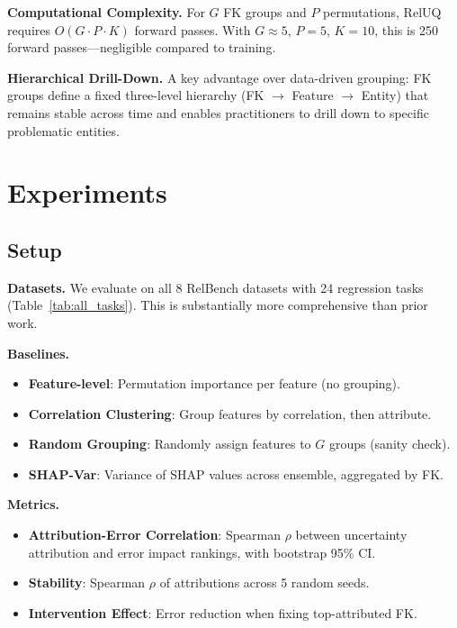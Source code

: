 \documentclass{article}
\begin{document}
\textbf{Computational Complexity.}
For $G$ FK groups and $P$ permutations, RelUQ requires $O(G \cdot P \cdot K)$ forward
passes. With $G \approx 5$, $P = 5$, $K = 10$, this is 250 forward passes---negligible
compared to training.

\textbf{Hierarchical Drill-Down.}
A key advantage over data-driven grouping: FK groups define a fixed three-level hierarchy
(FK $\to$ Feature $\to$ Entity) that remains stable across time and enables practitioners
to drill down to specific problematic entities.

\section{Experiments}
\label{sec:experiments}

\subsection{Setup}

\textbf{Datasets.} We evaluate on all 8 RelBench datasets with 24 regression tasks
(Table~\ref{tab:all_tasks}). This is substantially more comprehensive than prior work.

\textbf{Baselines.}
\begin{itemize}
    \item \textbf{Feature-level}: Permutation importance per feature (no grouping).
    \item \textbf{Correlation Clustering}: Group features by correlation, then attribute.
    \item \textbf{Random Grouping}: Randomly assign features to $G$ groups (sanity check).
    \item \textbf{SHAP-Var}: Variance of SHAP values across ensemble, aggregated by FK.
\end{itemize}

\textbf{Metrics.}
\begin{itemize}
    \item \textbf{Attribution-Error Correlation}: Spearman $\rho$ between uncertainty
    attribution and error impact rankings, with bootstrap 95\% CI.
    \item \textbf{Stability}: Spearman $\rho$ of attributions across 5 random seeds.
    \item \textbf{Intervention Effect}: Error reduction when fixing top-attributed FK.
\end{itemize}
\end{document}
